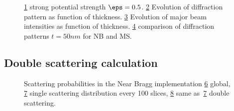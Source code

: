 \documentclass[a4paper,10pt]{article}
\begin{document}
\begin{figure}[h!]
	\begin{subfigure}{0.24\textwidth}
		\centering
    \def\svgwidth{\columnwidth}
		
		\caption{}\label{fig:MSvsNBstrong_V}
	\end{subfigure}
	\begin{subfigure}{0.24\textwidth}
		\centering
    \def\svgwidth{\columnwidth}
		
		\caption{}\label{fig:MSvsNBstrong_Iz}
	\end{subfigure}
  \begin{subfigure}{0.24\textwidth}
		\centering
    \def\svgwidth{\columnwidth}
		
		\caption{}\label{fig:MSvsNBstrong_Bz}
	\end{subfigure}
	\begin{subfigure}{0.24\textwidth}
		\centering
    \def\svgwidth{\columnwidth}
		
		\caption{}\label{fig:MSvsNBstrong_I}
	\end{subfigure}

	\caption[MS vs NB strong]{
		\ref{fig:MSvsNBstrong_V} strong potential strength $\eps=0.5$.
		\ref{fig:MSvsNBstrong_Iz} Evolution of diffraction pattern as function of thickness.
		\ref{fig:MSvsNBstrong_Bz} Evolution of major beam intensities as function of thickness.
		\ref{fig:MSvsNBstrong_I} comparison of diffraction patterns $t=50nm$ for NB and MS.
	}\label{fig:MSvsNBstrong}
\end{figure}



\subsection{Double scattering calculation}



\begin{figure}[h!]
	\begin{subfigure}{0.33\textwidth}
		\centering
    \def\svgwidth{\columnwidth}
		
		\caption{}\label{fig:NBproba}
	\end{subfigure}
	\begin{subfigure}{0.33\textwidth}
		\centering
    \def\svgwidth{\columnwidth}
		
		\caption{}\label{fig:NBsingle}
	\end{subfigure}
  \begin{subfigure}{0.33\textwidth}
		\centering
    \def\svgwidth{\columnwidth}
		
		\caption{}\label{fig:NBdouble}
	\end{subfigure}

	\caption[Near Bragg scattering probabilities]{
  Scattering probabilities in the Near Bragg implementation
		\ref{fig:NBproba} global,
		\ref{fig:NBsingle} single scattering distribution  every 100 slices,
    \ref{fig:NBdouble} same as~\ref{fig:NBsingle} double scattering.
	}\label{fig:NBprobabilities}
\end{figure}
\end{document}
